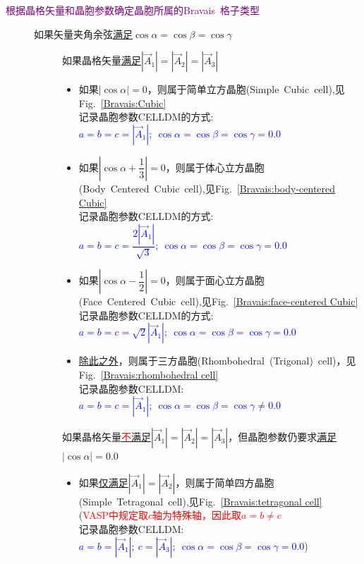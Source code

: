 \documentclass{article}      %
\begin{document}
\noindent\textcolor{purple}{根据晶格矢量和晶胞参数确定晶胞所属的\textrm{Bravais~}格子类型}
\begin{description}
	\item[]如果矢量夹角余弦\underline{满足}$\cos\alpha=\cos\beta=\cos\gamma$
		\begin{description}
			\item[] 如果晶格矢量\underline{满足}$|\vec A_1|=|\vec A_2|=|\vec A_3|$
				\begin{itemize}
					\item 如果$|\cos\alpha|=0$，则属于简单立方晶胞(\textrm{Simple~Cubic~cell}),见\textrm{Fig.~}\ref{Bravais:Cubic}\\
						记录晶胞参数\textrm{CELLDM}的方式:~\textcolor{blue}{$a=b=c=|\vec A_1|;~\cos\alpha=\cos\beta=\cos\gamma=0.0$}
					\item 如果$|\cos\alpha+\dfrac13|=0$，则属于体心立方晶胞(\textrm{Body~Centered~Cubic~cell}),见\textrm{Fig.~}\ref{Bravais:body-centered Cubic}\\ 
						记录晶胞参数\textrm{CELLDM}的方式:~\textcolor{blue}{$a=b=c=\dfrac{2|\vec A_1|}{\sqrt3};~\cos\alpha=\cos\beta=\cos\gamma=0.0$}
					\item 如果$|\cos\alpha-\dfrac12|=0$，则属于面心立方晶胞(\textrm{Face~Centered~Cubic~cell}),见\textrm{Fig.~}\ref{Bravais:face-centered Cubic}\\ 
						记录晶胞参数\textrm{CELLDM}的方式:~\textcolor{blue}{$a=b=c=\sqrt2|\vec A_1|;~\cos\alpha=\cos\beta=\cos\gamma=0.0$}
					\item \underline{除此之外}，则属于三方晶胞(\textrm{Rhombohedral~(Trigonal)~cell})，见\textrm{Fig.~}\ref{Bravais:rhombohedral cell}\\
						记录晶胞参数\textrm{CELLDM}:~\textcolor{blue}{$a=b=c=|\vec A_1|;~\cos\alpha=\cos\beta=\cos\gamma\neq 0.0$}
				\end{itemize}
			\item[] 如果晶格矢量\underline{\textcolor{red}{不}满足}$|\vec A_1|=|\vec A_2|=|\vec A_3|$，但晶胞参数仍要求\underline{满足}$|\cos\alpha|=0.0$
				\begin{itemize}
					\item 如果\underline{仅满足}$|\vec A_1|=|\vec A_2|$，则属于简单四方晶胞(\textrm{Simple~Tetragonal~cell}),见\textrm{Fig.~}\ref{Bravais:tetragonal cell}\\
						(\textcolor{red}{\textrm{VASP}中规定取$c$轴为特殊轴，因此取$a=b\neq c$}\\
						记录晶胞参数\textrm{CELLDM}:~\textcolor{blue}{$a=b=|\vec A_1|;~c=|\vec A_3|;~\cos\alpha=\cos\beta=\cos\gamma=0.0$})

\end{itemize}
\end{description}
\end{description}
\end{document}
